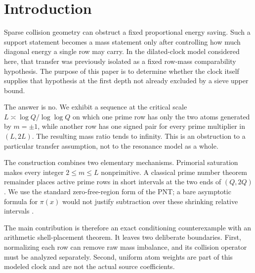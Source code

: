 \section{Introduction}

Sparse collision geometry can obstruct a fixed proportional energy saving.  Such a
support statement becomes a mass statement only after controlling how much diagonal
energy a single row may carry.  In the dilated-clock model considered here, that
transfer was previously isolated as a fixed row-mass comparability hypothesis.  The
purpose of this paper is to determine whether the clock itself supplies that
hypothesis at the first depth not already excluded by a sieve upper bound.

The answer is no.  We exhibit a sequence at the critical scale
$L\asymp\log Q/\log\log Q$ on which one prime row has only the two atoms generated by
$m=\pm1$, while another row has one signed pair for every prime multiplier in
$(L,2L)$.  The resulting mass ratio tends to infinity.  This is an obstruction to a
particular transfer assumption, not to the resonance model as a whole.

The construction combines two elementary mechanisms.  Primorial saturation makes
every integer $2\le m\le L$ nonprimitive.  A classical prime number theorem remainder
places active prime rows in short intervals at the two ends of $(Q,2Q)$.  We use the
standard zero-free-region form of the PNT; a bare asymptotic formula for $\pi(x)$ would
not justify subtraction over these shrinking relative intervals
\citep{davenport2000,montgomeryvaughan2007}.

The main contribution is therefore an exact conditioning counterexample with an
arithmetic shell-placement theorem.  It leaves two deliberate boundaries.  First,
normalizing each row can remove raw mass imbalance, and its collision operator must be
analyzed separately.  Second, uniform atom weights are part of this modeled clock and
are not the actual source coefficients.
